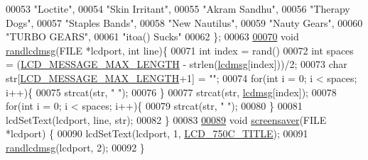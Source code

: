 \begin{DoxyCode}
00053     \textcolor{stringliteral}{"Loctite"},
00054     \textcolor{stringliteral}{"Skin Irritant"},
00055     \textcolor{stringliteral}{"Akram Sandhu"},
00056     \textcolor{stringliteral}{"Therapy Dogs"},
00057     \textcolor{stringliteral}{"Staples Bands"},
00058     \textcolor{stringliteral}{"New Nautilus"},
00059     \textcolor{stringliteral}{"Nauty Gears"},
00060     \textcolor{stringliteral}{"TURBO GEARS"},
00061     \textcolor{stringliteral}{"itoa() Sucks"}
00062 \};
00063 
\hypertarget{lcdmsg_8c_source.tex_l00070}{}\hyperlink{lcdmsg_8h_aabe33dfb797df5997c5e03078591aa81}{00070} \textcolor{keywordtype}{void} \hyperlink{lcdmsg_8c_aabe33dfb797df5997c5e03078591aa81}{randlcdmsg}(FILE *lcdport, \textcolor{keywordtype}{int} line)\{
00071     \textcolor{keywordtype}{int} index = rand() %
00072     \textcolor{keywordtype}{int} spaces = (\hyperlink{lcdmsg_8h_abe4c4b70fc6f44ae3680e5b2c68cdd00}{LCD\_MESSAGE\_MAX\_LENGTH} - strlen(\hyperlink{lcdmsg_8c_abbcf1856a4c9063200ef3f4131fd05f5}{lcdmsg}[index]))/2;
00073     \textcolor{keywordtype}{char} str[\hyperlink{lcdmsg_8h_abe4c4b70fc6f44ae3680e5b2c68cdd00}{LCD\_MESSAGE\_MAX\_LENGTH}+1] = \textcolor{stringliteral}{""};
00074     \textcolor{keywordflow}{for}(\textcolor{keywordtype}{int} i = 0; i < spaces; i++)\{
00075         strcat(str, \textcolor{stringliteral}{" "});
00076     \}
00077     strcat(str, \hyperlink{lcdmsg_8c_abbcf1856a4c9063200ef3f4131fd05f5}{lcdmsg}[index]);
00078     \textcolor{keywordflow}{for}(\textcolor{keywordtype}{int} i = 0; i < spaces; i++)\{
00079         strcat(str, \textcolor{stringliteral}{" "});
00080     \}
00081     lcdSetText(lcdport, line, str);
00082 \}
00083 
\hypertarget{lcdmsg_8c_source.tex_l00089}{}\hyperlink{lcdmsg_8h_acc19fe50b302412c894538965e77cb8b}{00089} \textcolor{keywordtype}{void} \hyperlink{lcdmsg_8c_acc19fe50b302412c894538965e77cb8b}{screensaver}(FILE *lcdport) \{
00090     lcdSetText(lcdport, 1, \hyperlink{lcdmsg_8h_aa9575881ef196e5c94e60d183742eee7}{LCD\_750C\_TITLE});
00091     \hyperlink{lcdmsg_8c_aabe33dfb797df5997c5e03078591aa81}{randlcdmsg}(lcdport, 2);
00092 \}
\end{DoxyCode}
